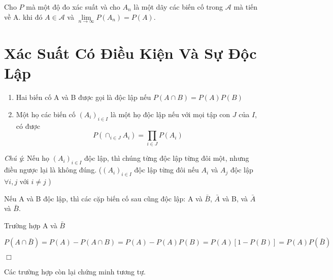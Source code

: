 \begin{DL}
Cho $P$ mà một độ đo xác suất và cho $A_n$ là một dãy các biến cố trong $\mathscr{A}$ mà tiến về A. khi đó $A \in \mathscr{A}$ và $ \lim \limits_{n \to \infty } P \left( A_n \right) = P \left( A \right)$.
\end{DL}


\section{Xác Suất Có Điều Kiện Và Sự Độc Lập }

\begin{DN}
	
	\begin{enumerate}[\qquad a{)}] 
	 \item Hai biến cố A và B được gọi là độc lập nếu $P\left( A \cap B \right) = P\left( A\right)P\left( B\right)$
	 \item Một họ các biến cố $\left( A_i\right)_{i \in I}$ là một họ độc lập nếu với mọi tập con $J$ của $I$, có được
	 	\[ P\left( \cap_{i \in J} A_i\right) = \prod\limits_{i \in J} {P\left( A_i\right)} \]
		
	\end{enumerate}

\end{DN}
\indent \textit{Chú ý}: Nếu họ $\left( A_i\right)_{i \in I}$ độc lập, thì chúng từng độc lập từng đôi một, nhưng điều ngược lại là không đúng. ($\left( A_i\right)_{i \in I}$ độc lập từng đôi nếu $A_i$ và $A_j$ độc lập $\forall i, j$ với $i \ne j$ )

\begin{DL}
	Nếu A và B độc lập, thì các cặp biến cố sau cũng độc lập: A và $\bar{B}$, $\bar{A}$ và B, và $\bar{A}$ và $\bar{B}$.
	
	\end{DL}

\begin{CM}
	Trường hợp A và $\bar{B}$
	
	$P \left( A \cap \bar{B} \right) = P \left( A \right) - P \left( A \cap B \right) = P \left( A \right) - P \left( A \right) P \left( B \right) = P \left( A \right) \left[ 1 - P \left( B \right) \right] = P \left( A \right) P \left( \bar{B} \right) $
	\end{CM}
\begin{flushright}
	$\Box$
\end{flushright}

Các trường hợp còn lại chứng minh tương tự.


